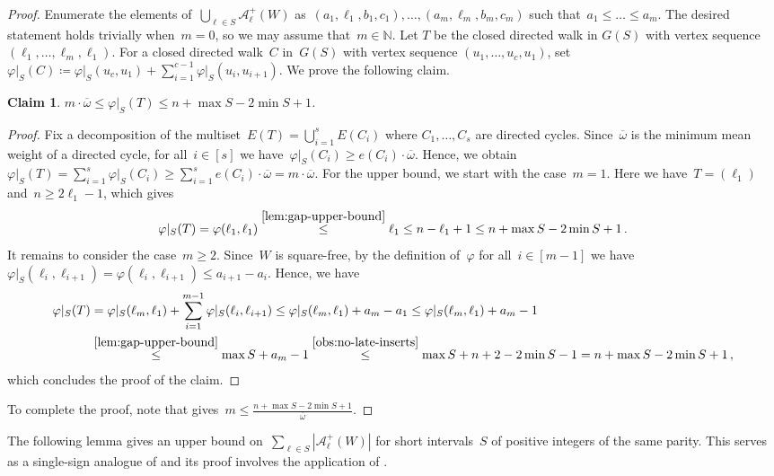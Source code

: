 \documentclass[12pt]{article}
\theoremstyle{plain}
\newtheorem{claim}[theorem]{Claim}
\theoremstyle{definition}
\newcommand{\oldqed}{}
\def\endofClaim{\hfill\scalebox{.6}{$\Box$}}
\newenvironment{claimproof}[1][Proof]{
	\renewcommand{\oldqed}{\qedsymbol}
	\renewcommand{\qedsymbol}{\endofClaim}
	\begin{proof}[#1]
	}{
	\end{proof}
	\renewcommand{\qedsymbol}{\oldqed}
}
\newcommand\N{\mathbb{N}}
\newcommand{\coleq}{\coloneq}
\newcommand{\cA}{\mathcal A}
\newcommand{\f}{\varphi}
\newcommand{\w}{\f\vert_S}
\newcommand{\bw}{\overline \omega}
\newcommand{\abs}[1]{\mathopen{}\left\lvert#1\right\rvert\mathclose{}}
\begin{document}
	\begin{proof}
		Enumerate the elements of~$\bigcup_{\ell\in S}\cA^{+}_\ell(W)$ as~$(a_1,\ell_1,b_1,c_1),\dots,(a_m,\ell_m,b_m,c_m)$ such that~$a_1\le \dots\le a_m$. The desired statement holds trivially when~$m=0$, so we may assume that~$m\in\N$. Let $T$ be the closed directed walk in $G(S)$ with vertex sequence $(\ell_1,\dots,\ell_m,\ell_1)$. For a closed directed walk~$C$ in~$G(S)$ with vertex sequence $(u_1,\dots,u_c,u_1)$, set~$\w(C) \coleq \w(u_c,u_1) + \sum_{i=1}^{c-1} \w(u_i,u_{i+1})$. We prove the following claim.
		
		\begin{claim} \label{claim:start-span-word}
			$m\cdot\bw \le \w(T) \le n+\max S-2\min S+1$.
		\end{claim}
		
		\begin{claimproof}
			Fix a decomposition of the multiset~$E(T)=\bigcup_{i=1}^sE(C_i)$ where $C_1,\dots,C_s$ are directed cycles. Since~$\bw$ is the minimum mean weight of a directed cycle, for all~$i\in[s]$ we have~$\w(C_i)\ge e(C_i)\cdot\bw$. Hence, we obtain~$\w(T) = \sum_{i=1}^s\w(C_i) \ge \sum_{i=1}^se(C_i)\cdot\bw = m\cdot\bw$. For the upper bound, we start with the case~$m=1$. Here we have~$T=(\ell_1)$ and~$n\ge2\ell_1-1$, which gives
			\[ \w(T)=\f(\ell_1,\ell_1)\overset{\ref{lem:gap-upper-bound}}\le\ell_1\le n-\ell_1+1\le n+\max S-2\min S+1\,. \]
			It remains to consider the case~$m\ge2$. Since~$W$ is square-free, by the definition of~$\f$ for all~$i\in[m-1]$ we have~$\w(\ell_{i},\ell_{i+1}) = \f(\ell_{i},\ell_{i+1}) \le a_{i+1}-a_i$. Hence, we have
			\begin{align*}
				\w(T) &= \w(\ell_m,\ell_1) + \sum_{i=1}^{m-1}\w(\ell_i,\ell_{i+1}) \le \w(\ell_m,\ell_1) + a_m-a_1 \le\w(\ell_m,\ell_1) + a_m-1\\
				&\overset{\ref{lem:gap-upper-bound}}\le  \max S+a_m-1\overset{\ref{obs:no-late-inserts}}\le \max S+n+2-2\min S-1= n+\max S-2\min S+1\,,
			\end{align*}
			which concludes the proof of the claim.
		\end{claimproof}
		
		To complete the proof, note that  gives~$m\le\frac{n+\max S-2\min S+1}{\bw}$.
	\end{proof}
	
	The following lemma gives an upper bound on~$\sum_{\ell\in S}\abs{\cA^{+}_\ell(W)}$ for short intervals~$S$ of positive integers of the same parity. This serves as a single-sign analogue of  and its proof involves the application of .
	
\end{document}
